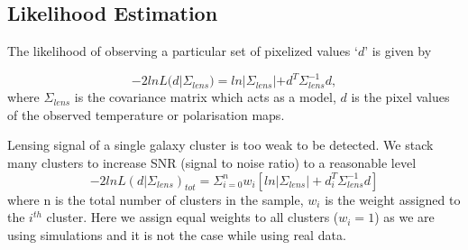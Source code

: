 \subsection*{Likelihood Estimation}
\label{lkhd_est}
  The likelihood of observing a particular set of pixelized values `$d$' is given by 
  
  \begin{equation}
  -2lnL(d|\Sigma_{lens}) = ln |\Sigma_{lens}| + d^{T} \Sigma^{-1}_{lens} d,
  \end{equation}
 where $\Sigma_{lens}$ is the covariance matrix which acts as a model, $d$ is the pixel values of the observed temperature or polarisation maps.
  
  Lensing signal of a single galaxy cluster is too weak to be detected. 
  We stack many clusters to increase SNR (signal to noise ratio) to a reasonable level
  \begin{equation}
  -2ln L(d| \Sigma_{lens})_{tot} = \Sigma^{n}_{i =0} w_{i} [ln |\Sigma_{lens}| + d^{T}_{i} \Sigma^{-1}_{lens}  d]
  \end{equation}
  where n is the total number of clusters in the sample, $w_{i}$ is the weight assigned to the $i^{th}$ cluster.
  Here we assign equal weights to all clusters ($w_{i} = 1$) as we are using simulations and it is not the case while using real data. %



